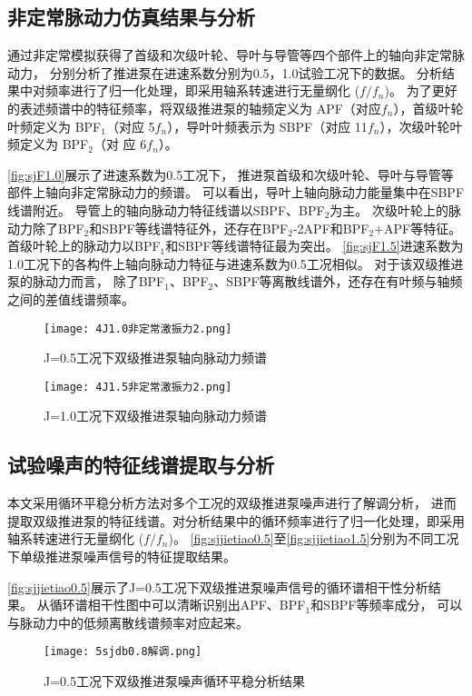 \subsection{非定常脉动力仿真结果与分析}
通过非定常模拟获得了首级和次级叶轮、导叶与导管等四个部件上的轴向非定常脉动力，
分别分析了推进泵在进速系数分别为0.5，1.0试验工况下的数据。
分析结果中对频率进行了归一化处理，即采用轴系转速进行无量纲化 ($f/f_n$)。
为了更好的表述频谱中的特征频率，将双级推进泵的轴频定义为 APF（对应$f_n$），首级叶轮叶频定义为
BPF$_1$（对应 5$f_n$），导叶叶频表示为 SBPF（对应 11$f_n$），次级叶轮叶频定义为 BPF$_2$（对
应 6$f_n$）。

\autoref{fig:sjF1.0}展示了进速系数为0.5工况下，
推进泵首级和次级叶轮、导叶与导管等部件上轴向非定常脉动力的频谱。
可以看出，导叶上轴向脉动力能量集中在SBPF线谱附近。
导管上的轴向脉动力特征线谱以SBPF、BPF$_2$为主。
次级叶轮上的脉动力除了BPF$_2$和SBPF等线谱特征外，还存在BPF$_2$-2APF和BPF$_2$+APF等特征。
首级叶轮上的脉动力以BPF$_1$和SBPF等线谱特征最为突出。
\autoref{fig:sjF1.5}进速系数为1.0工况下的各构件上轴向脉动力特征与进速系数为0.5工况相似。
对于该双级推进泵的脉动力而言，
除了BPF$_1$、BPF$_2$、SBPF等离散线谱外，还存在有叶频与轴频之间的差值线谱频率。
\begin{comment}
\begin{figure}[htbp]
    \centering
    \texttt{[image: 4J0.5非定常激振力1.png]}
    \caption{\label{fig:sjF0.5}J=0.5工况下双级推进泵轴向脉动力频谱}
\end{figure}
\end{comment}
\begin{figure}[htbp]
    \centering
    \texttt{[image: 4J1.0非定常激振力2.png]}
    \caption{\label{fig:sjF1.0}J=0.5工况下双级推进泵轴向脉动力频谱}
\end{figure}
\begin{figure}[htbp]
    \centering
    \texttt{[image: 4J1.5非定常激振力2.png]}
    \caption{\label{fig:sjF1.5}J=1.0工况下双级推进泵轴向脉动力频谱}
\end{figure}
\subsection{试验噪声的特征线谱提取与分析}
本文采用循环平稳分析方法对多个工况的双级推进泵噪声进行了解调分析，
进而提取双级推进泵的特征线谱。对分析结果中的循环频率进行了归一化处理，即采用轴系转速进行无量纲化 ($f/f_n$)。
\autoref{fig:sjjietiao0.5}至\autoref{fig:sjjietiao1.5}分别为不同工况下单级推进泵噪声信号的特征提取结果。

\autoref{fig:sjjietiao0.5}展示了J=0.5工况下双级推进泵噪声信号的循环谱相干性分析结果。
从循环谱相干性图中可以清晰识别出APF、BPF$_1$和SBPF等频率成分，
可以与脉动力中的低频离散线谱频率对应起来。
\begin{figure}[htbp]
    \centering
    \texttt{[image: 5sjdb0.8解调.png]}
    \caption{\label{fig:sjjietiao0.5}J=0.5工况下双级推进泵噪声循环平稳分析结果}
\end{figure}

